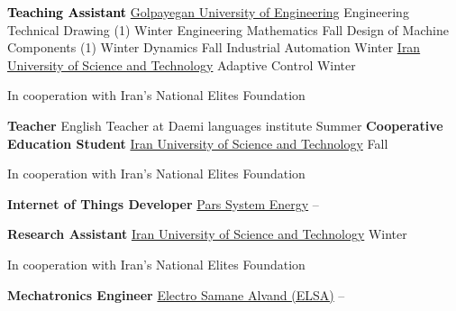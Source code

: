 \documentclass[a4paper,MMMyyyy,nonstopmode]{ResumeTemplate}
\begin{document}
\begin{Body}
\Entry
\textcolor{black}{\textbf{Teaching Assistant}}
\Gap
\BulletItem
\href{https://www.linkedin.com/company/golpauni/?originalSubdomain=de}{Golpayegan University of Engineering}
\newline
Engineering Technical Drawing (1) 
\hfill
Winter 
\newline
Engineering Mathematics 
\hfill
Fall 
\newline
Design of Machine Components (1)
\hfill
Winter 
\newline
Dynamics
\hfill
Fall 
\newline
Industrial Automation
\hfill
Winter 
\BulletItem
\href{https://www.linkedin.com/school/iran-university-of-science-and-technology}{Iran University of Science and Technology}
\newline
Adaptive Control
\hfill
Winter 
\begin{Detail}
	\qquad In cooperation with Iran's National Elites Foundation
\end{Detail}
\Entry
\vspace{5pt}
\textbf{Teacher}
\Gap
\BulletItem
English Teacher at Daemi languages institute
\hfill
Summer 
\Entry
\vspace{5pt}
\textbf{Cooperative Education Student}
\Gap
\BulletItem
\href{https://www.linkedin.com/school/iran-university-of-science-and-technology}{Iran University of Science and Technology}
\hfill
Fall 
\begin{Detail}
\qquad In cooperation with Iran's National Elites Foundation
\end{Detail}

\Entry
\vspace{5pt}
\textbf{Internet of Things Developer}
\Gap
\BulletItem
\href{https://pseco.net/}{Pars System Energy}
\hfill
{} –

\Entry
\vspace{5pt}
\textbf{Research Assistant}
\Gap
\BulletItem
\href{https://www.linkedin.com/school/iran-university-of-science-and-technology}{Iran University of Science and Technology}
\hfill
Winter 
\begin{Detail}
	\qquad In cooperation with Iran's National Elites Foundation
\end{Detail}

\Entry
\vspace{5pt}
\textbf{Mechatronics Engineer}
\Gap
\BulletItem
\href{https://www.linkedin.com/company/electro-samane-alvand-elsa/mycompany/}{Electro Samane Alvand (ELSA)}
\hfill
{} – 


\end{Body}
\end{document}
